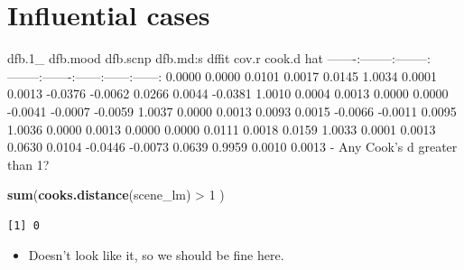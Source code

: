 \documentclass[]{article}
\newenvironment{Shaded}{}{}
\newcommand{\KeywordTok}[1]{\textcolor[rgb]{0.00,0.44,0.13}{\textbf{{#1}}}}
\newcommand{\DecValTok}[1]{\textcolor[rgb]{0.25,0.63,0.44}{{#1}}}
\newcommand{\StringTok}[1]{\textcolor[rgb]{0.25,0.44,0.63}{{#1}}}
\newcommand{\NormalTok}[1]{{#1}}
\begin{document}
\section{Influential cases}\label{influential-cases}

\begin{Shaded}
\end{Shaded}

\textbar{} dfb.1\_\textbar{} dfb.mood\textbar{} dfb.scnp\textbar{}
dfb.md:s\textbar{} dffit\textbar{} cov.r\textbar{} cook.d\textbar{}
hat\textbar{}
\textbar{}-------:\textbar{}--------:\textbar{}--------:\textbar{}--------:\textbar{}-------:\textbar{}------:\textbar{}------:\textbar{}------:\textbar{}
\textbar{} 0.0000\textbar{} 0.0000\textbar{} 0.0101\textbar{}
0.0017\textbar{} 0.0145\textbar{} 1.0034\textbar{} 0.0001\textbar{}
0.0013\textbar{} \textbar{} -0.0376\textbar{} -0.0062\textbar{}
0.0266\textbar{} 0.0044\textbar{} -0.0381\textbar{} 1.0010\textbar{}
0.0004\textbar{} 0.0013\textbar{} \textbar{} 0.0000\textbar{}
0.0000\textbar{} -0.0041\textbar{} -0.0007\textbar{} -0.0059\textbar{}
1.0037\textbar{} 0.0000\textbar{} 0.0013\textbar{} \textbar{}
0.0093\textbar{} 0.0015\textbar{} -0.0066\textbar{} -0.0011\textbar{}
0.0095\textbar{} 1.0036\textbar{} 0.0000\textbar{} 0.0013\textbar{}
\textbar{} 0.0000\textbar{} 0.0000\textbar{} 0.0111\textbar{}
0.0018\textbar{} 0.0159\textbar{} 1.0033\textbar{} 0.0001\textbar{}
0.0013\textbar{} \textbar{} 0.0630\textbar{} 0.0104\textbar{}
-0.0446\textbar{} -0.0073\textbar{} 0.0639\textbar{} 0.9959\textbar{}
0.0010\textbar{} 0.0013\textbar{} - Any Cook's d greater than 1?

\begin{Shaded}
\begin{Highlighting}[]
\KeywordTok{sum}\NormalTok{(}\KeywordTok{cooks.distance}\NormalTok{(scene_lm) >}\StringTok{ }\DecValTok{1} \NormalTok{)}
\end{Highlighting}
\end{Shaded}

\begin{verbatim}
[1] 0
\end{verbatim}

\begin{itemize}
\itemsep1pt\parskip0pt
\item
  Doesn't look like it, so we should be fine here.
\end{itemize}
\end{document}
